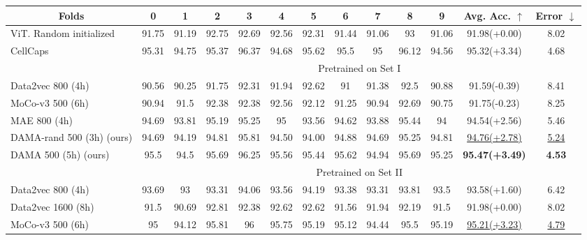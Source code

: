 \documentclass[10pt,twocolumn,letterpaper]{article}
\begin{document}
\begin{table*}[t]
\footnotesize
\centering
\begin{tabular}{lcccccccccccc}
\hline
\multicolumn{1}{c}{Folds}                 & 0     & 1     & 2     & 3     & 4     & 5     & 6     & 7     & 8     & 9     & Avg. Acc. $\uparrow$ & Error $\downarrow$           \\ \hline
ViT. Random   initialized        & 91.75 & 91.19 & 92.75 & 92.69 & 92.56 & 92.31 & 91.44 & 91.06 & 93    & 91.06 & 91.98(+0.00)  &  8.02      \\ 
CellCaps \cite{maric2021whole}        & 95.31 & 94.75 & 95.37 & 96.37 & 94.68 & 95.62 & 95.5 & 95 & 96.12    & 94.56 & 95.32(+3.34)  &  4.68      \\ \hline
                      & \multicolumn{12}{c}{Pretrained on  Set I}               \\ \hline
Data2vec \cite{data2vec} 800 (4h)        & 90.56 & 90.25 & 91.75 & 92.31 & 91.94 & 92.62 & 91    & 91.38 & 92.5  & 90.88 & 91.59(-0.39) &  8.41        \\
MoCo-v3 \cite{mocov3} 500 (6h)            & 90.94 & 91.5  & 92.38 & 92.38 & 92.56 & 92.12 & 91.25 & 90.94 & 92.69 & 90.75 & 91.75(-0.23) &  8.25      \\
MAE \cite{mae}  800 (4h)             & 94.69 & 93.81 & 95.19 & 95.25 & 95    & 93.56 & 94.62 & 93.88 & 95.44 & 94 & 94.54(+2.56)  & 5.46 \\
DAMA-rand 500 (3h) (ours)           & 94.69 & 94.19 & 94.81 & 95.81 & 94.50 & 94.00 & 94.88 & 94.69 & 95.25 & 94.81  & \underline{94.76(+2.78)} & \underline{5.24} \\
DAMA 500 (5h) (ours)           & 95.5 & 94.5 & 95.69 & 96.25 & 95.56 & 95.44 & 95.62 & 94.94 & 95.69 & 95.25 & \textbf{95.47(+3.49)} & \textbf{4.53} \\ \hline                      
                      & \multicolumn{12}{c}{Pretrained on Set II}                                                         \\ \hline
Data2vec \cite{data2vec} 800 (4h)    & 93.69 & 93    & 93.31 & 94.06 & 93.56 & 94.19 & 93.38 & 93.31 & 93.81 & 93.5  & 93.58(+1.60)  &   6.42    \\
Data2vec \cite{data2vec} 1600   (8h) & 91.5  & 90.69 & 92.81 & 92.38 & 92.62 & 92.62 & 91.56 & 91.94 & 92.19 & 91.5  & 91.98(+0.00)  &   8.02    \\
MoCo-v3 \cite{mocov3} 500 (6h)        & 95    & 94.12 & 95.81 & 96    & 95.75 & 95.19 & 95.12 & 94.44 & 95.5  & 95.19 & \underline{95.21(+3.23)} &  \underline{4.79} \\

\end{tabular}
\end{table*}
\end{document}
